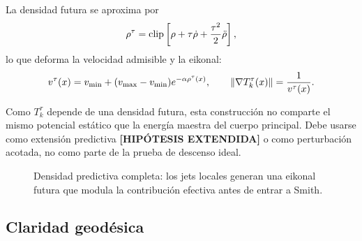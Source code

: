 La densidad futura se aproxima por
\begin{equation}
  \rho^\tau=
  \operatorname{clip}\left[
  \rho+\tau\dot\rho+\frac{\tau^2}{2}\ddot\rho
  \right],
  \label{eq:anexo_rho_tau}
\end{equation}
lo que deforma la velocidad admisible y la eikonal:
\begin{equation}
  v^\tau(x)=v_{\min}+(v_{\max}-v_{\min})e^{-\alpha\rho^\tau(x)},
  \qquad
  \left\|\nabla T_k^\tau(x)\right\|=\frac{1}{v^\tau(x)}.
  \label{eq:anexo_eikonal_predictiva}
\end{equation}

Como $T_k^\tau$ depende de una densidad futura, esta construcción no comparte el mismo
potencial estático que la energía maestra del cuerpo principal. Debe usarse como
extensión predictiva \textbf{[HIPÓTESIS EXTENDIDA]} o como perturbación acotada, no como parte de la
prueba de descenso ideal.

\begin{figure}[H]
\centering
{}
\caption{Densidad predictiva completa: los jets locales generan una eikonal futura que
modula la contribución efectiva antes de entrar a Smith.}
\label{fig:anexo_densidad}
\end{figure}

\subsection{Claridad geodésica}
\label{subsec:claridad-geodesica}

